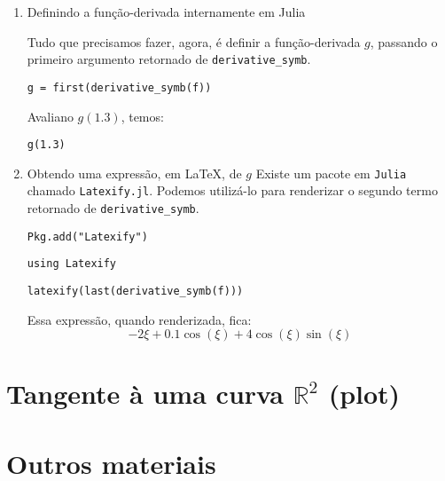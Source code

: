 \documentclass[12pt]{article}
\begin{document}
\begin{enumerate}
\item Definindo a função-derivada internamente em Julia
\label{sec:org3664dd4}

Tudo que precisamos fazer, agora, é definir a função-derivada \(g\),
passando o primeiro argumento retornado de \texttt{derivative\_symb}.

\begin{verbatim}
g = first(derivative_symb(f))
\end{verbatim}

Avaliano \(g(1.3)\), temos:

\begin{verbatim}
g(1.3)
\end{verbatim}

\item Obtendo uma expressão, em \LaTeX{}, de \(g\)
\label{sec:org847f6ab}
Existe um pacote em \texttt{Julia} chamado \texttt{Latexify.jl}. Podemos utilizá-lo
para renderizar o segundo termo retornado de \texttt{derivative\_symb}.

\begin{verbatim}
Pkg.add("Latexify")
\end{verbatim}


\begin{verbatim}
using Latexify
\end{verbatim}

\begin{verbatim}
latexify(last(derivative_symb(f)))
\end{verbatim}

Essa expressão, quando renderizada, fica:
\begin{equation}
 - 2 \xi + 0.1 \cos\left( \xi \right) + 4 \cos\left( \xi \right) \sin\left( \xi \right)
\end{equation}
\end{enumerate}

\section{Tangente à uma curva \(\mathbb{R}^2\) (plot)}
\label{sec:orgd4dba6e}
\section{Outros materiais}
\label{sec:org6fcca4e}
\end{document}

